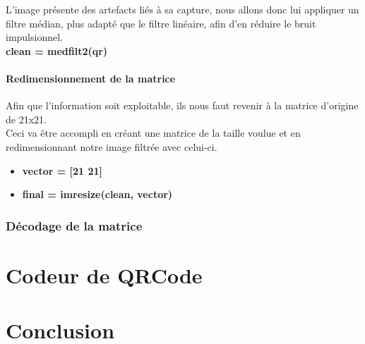 \documentclass{report}
\begin{document}
				L'image présente des artefacts liés à sa capture, nous allons donc lui appliquer un filtre médian, plus adapté que le filtre linéaire, afin d'en réduire le bruit impulsionnel.\\

				\textbf{clean = medfilt2(qr)}

			\subsubsection{Redimensionnement de la matrice}

				Afin que l'information soit exploitable, ils nous faut revenir à la matrice d'origine de 21x21.\\
				Ceci va être accompli en créant une matrice de la taille voulue et en redimensionnant notre image filtrée avec celui-ci.\\

				\begin{itemize}
					\item \textbf{vector = [21 21]}
					\item \textbf{final = imresize(clean, vector)}
				\end{itemize}


		\subsection{Décodage de la matrice}


\chapter{Codeur de QRCode}

\chapter{Conclusion}
\end{document}
